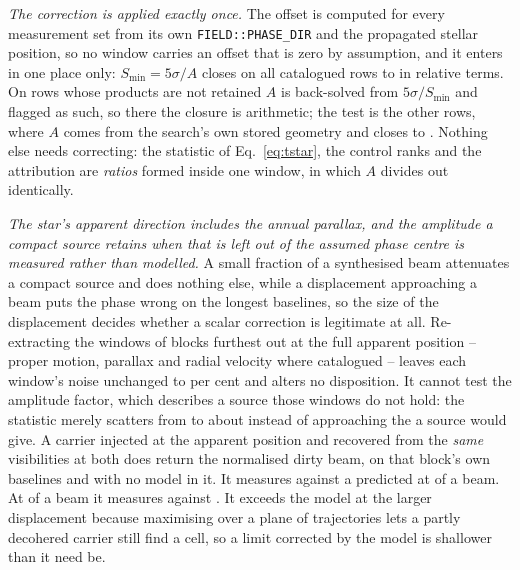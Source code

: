 \emph{The correction is applied exactly once.} The offset is computed for
every measurement set from its own \texttt{FIELD::PHASE\_DIR} and the
propagated stellar position, so no window carries an offset
that is zero by assumption, and it enters in one place only: $S_{\min}=5\sigma/A$ closes on all
\PbSminClosed{} catalogued rows to \PbSminWorstRes{} in relative terms. On
\PbSminTaut{} rows whose products are not retained $A$ is back-solved from
$5\sigma/S_{\min}$ and flagged as such, so there the closure is arithmetic;
the test is the other \PbSminIndep{} rows, where $A$ comes from the search's
own stored geometry and closes to \PbSminIndepRes. Nothing else needs
correcting: the statistic of
Eq.~\ref{eq:tstar}, the control ranks and the attribution are \emph{ratios}
formed inside one window, in which $A$ divides out identically.

\emph{The star's apparent direction includes the annual parallax, and the
amplitude a compact source retains when that is left out of the assumed phase
centre is measured rather than modelled.} A small fraction of a synthesised
beam attenuates a compact source and does nothing else, while a displacement
approaching a beam puts the phase wrong on the longest baselines, so the size
of the displacement decides whether a scalar correction is legitimate at all.
Re-extracting the \SensNReextWin{} windows of \SensNReextBlock{} blocks
furthest out at the full apparent position -- proper motion, parallax and
radial velocity where catalogued -- leaves each window's noise unchanged to
\SensReextNoiseMaxPct{} per cent and alters no disposition. It cannot test the
amplitude factor, which describes a source those windows do not hold: the
statistic merely scatters from \SensReTstarLo{} to \SensReTstarHi{} about
\SensReTstarMed{} instead of approaching the \SensPxLargePred{} a source
would give. A carrier injected at the apparent position and recovered from the
\emph{same} visibilities at both does return the normalised dirty beam, on
that block's own baselines and with no model in it. It measures
\SensPxSmallMeas{} against a predicted \SensPxSmallPred{} at
\SensPxSmallBeams{} of a beam. At \SensPxLargeBeams{} of a beam it measures
\SensPxLargeMeas{} against \SensPxLargePred. It
exceeds the model at the larger displacement because maximising over a plane
of trajectories lets a partly decohered carrier still find a cell, so a limit
corrected by the model is shallower than it need be.

